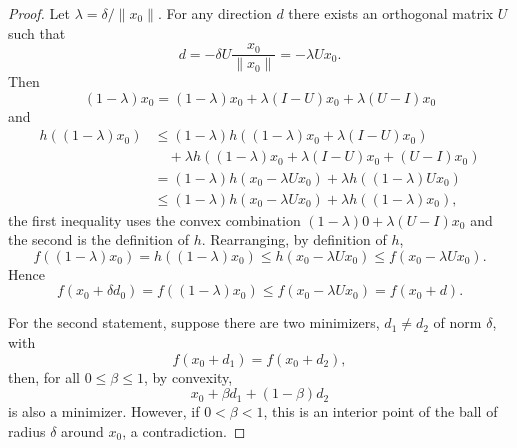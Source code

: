 \documentclass[10pt,a4paper]{amsart}
\begin{document}
\begin{proof}
Let $\lambda = \delta / \lVert x_{0} \rVert$.
For any direction $d$ there exists an orthogonal matrix $U$ such that
\begin{equation*}
d = - \delta U \frac{x_{0}}{\lVert x_{0} \rVert}
= - \lambda U x_{0}.
\end{equation*}
Then
\begin{equation*}
(1-\lambda) x_{0} = (1-\lambda) x_{0} +  \lambda (I - U)x_{0} + \lambda( U - I) x_{0}
\end{equation*}
and
\begin{align*}
h((1-\lambda)x_{0})
&\le (1 - \lambda ) h( (1- \lambda) x_{0} + \lambda (I - U)x_{0}) \\
&\quad+ \lambda h((1-\lambda) x_{0} + \lambda (I - U)x_{0} + (U - I)x_{0}) \\
&= (1- \lambda) h( x_{0} - \lambda U x_{0}) + \lambda h((1-\lambda) U x_{0}) \\
&\le (1- \lambda) h( x_{0} - \lambda U x_{0}) + \lambda h((1-\lambda) x_{0}),
\end{align*}
the first inequality uses the convex combination $(1- \lambda )0 + \lambda (U - I) x_{0}$ and the second is the definition of $h$.
Rearranging, by definition of $h$,
\begin{equation*}
f((1-\lambda)x_{0})
= h((1-\lambda)x_{0})
\le h(x_{0} - \lambda U x_{0})
\le f(x_{0} - \lambda U x_{0}).
\end{equation*}
Hence
\begin{equation*}
f(x_{0} + \delta d_{0})
= f((1- \lambda) x_{0})
\le f( x_{0} - \lambda U x_{0})
= f(x_{0} + d).
\end{equation*}

For the second statement, suppose there are two minimizers, $d_{1} \ne d_{2}$ of norm $\delta$, with
\begin{equation*}
f(x_{0} + d_{1}) = f(x_{0} + d_{2}),
\end{equation*}
then, for all $0 \le \beta \le 1$, by convexity,
\begin{equation*}
x_{0} + \beta d_{1} + (1- \beta) d_{2}
\end{equation*}
is also a minimizer.
However, if $0 < \beta < 1$, this is an interior point of the ball of radius $\delta$ around $x_{0}$, a contradiction.
\end{proof}
\end{document}
